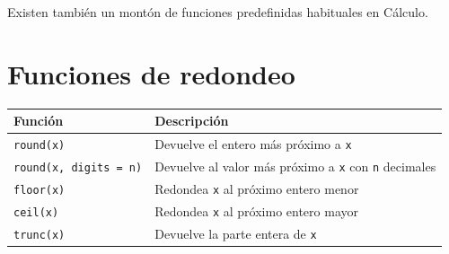 \documentclass[
  a4paper,
]{scrreport}
\theoremstyle{definition}
\theoremstyle{remark}
\begin{document}
Existen también un montón de funciones predefinidas habituales en
Cálculo.

\section{Funciones de redondeo}\label{funciones-de-redondeo}

\begin{longtable}[]{@{}
  >{\raggedright\arraybackslash}p{}
  >{\raggedright\arraybackslash}p{}@{}}
\toprule\noalign{}
\begin{minipage}[b]{\linewidth}\raggedright
Función
\end{minipage} & \begin{minipage}[b]{\linewidth}\raggedright
Descripción
\end{minipage} \\
\midrule\noalign{}
\endhead
\bottomrule\noalign{}
\endlastfoot
\texttt{round(x)} & Devuelve el entero más próximo a \texttt{x} \\
\texttt{round(x,\ digits\ =\ n)} & Devuelve al valor más próximo a
\texttt{x} con \texttt{n} decimales \\
\texttt{floor(x)} & Redondea \texttt{x} al próximo entero menor \\
\texttt{ceil(x)} & Redondea \texttt{x} al próximo entero mayor \\
\texttt{trunc(x)} & Devuelve la parte entera de \texttt{x} \\
\end{longtable}
\end{document}
